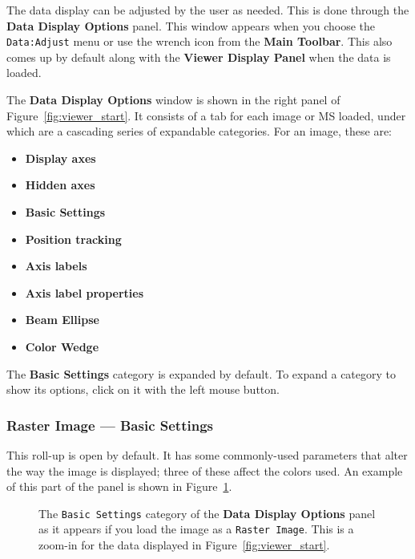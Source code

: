 The data display can be adjusted by the user as needed.  This
is done through the {\bf Data Display Options} panel.  This window
appears when you choose the {\tt Data:Adjust} menu or use the
wrench icon from the {\bf Main Toolbar}.  This also comes up
by default along with the {\bf Viewer Display Panel} when the
data is loaded.

The {\bf Data Display Options} window is shown in the right panel
of Figure~\ref{fig:viewer_start}.  It consists of a tab for each
image or MS loaded, under which are a cascading series of expandable
categories.  For an image, these are:
\begin{itemize}
   \item {\bf Display axes}
   \item {\bf Hidden axes}
   \item {\bf Basic Settings}
   \item {\bf Position tracking}
   \item {\bf Axis labels}
   \item {\bf Axis label properties}
   \item {\bf Beam Ellipse}
   \item {\bf Color Wedge}
\end{itemize}
The {\bf Basic Settings} category is expanded by
default.  To expand a category to show its options, click on it with
the left mouse button.


\subsubsection{Raster Image --- Basic Settings}
\label{section:display.image.raster.adjust.basic}

This roll-up is open by default.  It has some commonly-used parameters
that alter the way the image is displayed; three of these affect the
colors used. An example of this part of the panel is shown in
Figure~\ref{fig:viewer_raster_basic}.

\begin{figure}[h!]
\begin{center}
\caption{\label{fig:viewer_raster_basic} The {\tt Basic Settings}
category of the {\bf Data Display Options} panel
as it appears if you load the image as a {\tt Raster Image}.
This is a zoom-in for the data displayed in Figure~\ref{fig:viewer_start}.}
\hrulefill
\end{center}
\end{figure}

